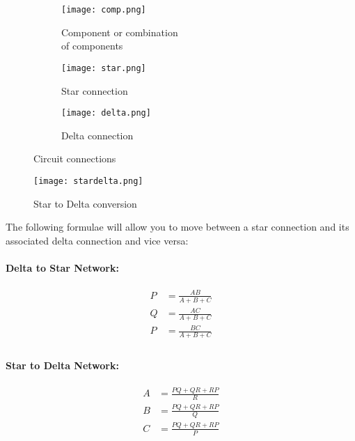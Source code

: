 \begin{figure}[!htb]
       \begin{subfigure}[t]{0.3\textwidth}
				\centering
                \texttt{[image: comp.png]}
                \captionsetup{justification=centering}
                \caption{Component or combination \\of components}
       \end{subfigure}%
       \begin{subfigure}[t]{0.3\textwidth}
				\centering
                \texttt{[image: star.png]}
                \caption{Star connection}
        \end{subfigure}%
        \begin{subfigure}[t]{0.3\textwidth}
        		\centering
                \texttt{[image: delta.png]}
                \caption{Delta connection}
        \end{subfigure}%
        \caption{Circuit connections}
        \label{fig:starAndDelta}
\end{figure}

\begin{figure}[!htb]
\centering
\texttt{[image: stardelta.png]}
\caption{Star to Delta conversion}
\label{fig:starToDelta}
\end{figure}

The following formulae will allow you to move between a star connection and its associated delta connection and vice versa:

\begin{minipage}{0.5\textwidth}
\centering
\paragraph*{Delta to Star Network:}
\begin{equation*}
\begin{aligned}
P &= \frac{A B}{A + B + C}\\
Q &= \frac{A C}{A + B + C}\\
P &= \frac{B C}{A + B + C}\\
\end{aligned}
\end{equation*}
\end{minipage}
\begin{minipage}{0.5\textwidth}
\centering
\paragraph*{Star to Delta Network:}
\begin{equation*}
\begin{aligned}
A &= \frac{P Q + Q R + R P}{R}\\
B &= \frac{P Q + Q R + R P}{Q}\\
C &= \frac{P Q + Q R + R P}{P}\\
\end{aligned}
\end{equation*}

\end{minipage}


